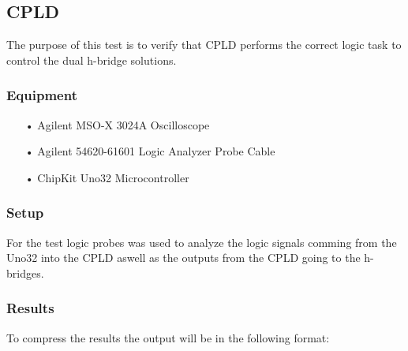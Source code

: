 \subsection{CPLD}
The purpose of this test is to verify that CPLD performs the correct logic task to control the dual h-bridge solutions.
\subsubsection{Equipment}
\begin{enumerate}
	\item[•]Agilent MSO-X 3024A Oscilloscope
	\item[•]Agilent 54620-61601 Logic Analyzer Probe Cable
	\item[•]ChipKit Uno32 Microcontroller
\end{enumerate}

\subsubsection{Setup}
For the test logic probes was used to analyze the logic signals comming from the Uno32 into the CPLD aswell as the outputs from the CPLD going to the h-bridges.

\subsubsection{Results}
To compress the results the output will be in the following format:
\begin{table}[h]
\centering
{}
\caption{Results example}
\label{resultsexample}
\end{table}

